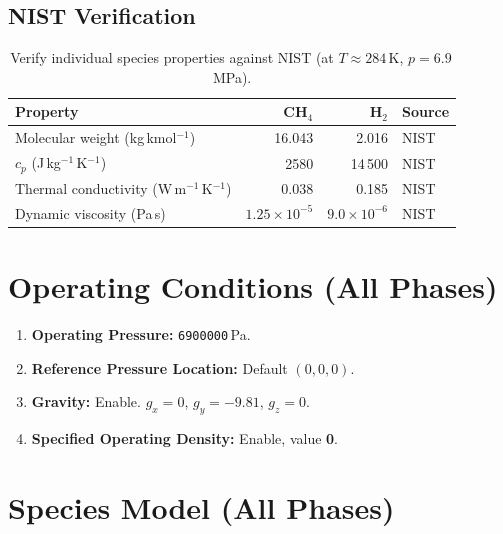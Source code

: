 \documentclass[12pt,a4paper]{report}
\begin{document}
\subsection{NIST Verification}

\begin{table}[H]
\centering
\caption{Verify individual species properties against NIST (at
$T \approx 284$\,K, $p = 6.9$\,MPa).}
\begin{tabular}{@{}lrrl@{}}
\toprule
\textbf{Property} & \textbf{CH$_4$} & \textbf{H$_2$} & \textbf{Source} \\
\midrule
Molecular weight (kg\,kmol$^{-1}$) & 16.043 & 2.016 & NIST \\
$c_p$ (J\,kg$^{-1}$\,K$^{-1}$)    & 2580   & 14\,500 & NIST \\
Thermal conductivity (W\,m$^{-1}$\,K$^{-1}$) & 0.038 & 0.185 & NIST \\
Dynamic viscosity (Pa\,s) & $1.25 \times 10^{-5}$ & $9.0 \times 10^{-6}$ & NIST \\
\bottomrule
\end{tabular}
\end{table}


\section{Operating Conditions (All Phases)}

\begin{enumerate}
  \item \textbf{Operating Pressure:} \texttt{6900000}\,Pa.
  \item \textbf{Reference Pressure Location:} Default $(0, 0, 0)$.
  \item \textbf{Gravity:} Enable.  $g_x = 0$, $g_y = -9.81$,
        $g_z = 0$.
  \item \textbf{Specified Operating Density:} Enable, value
        \textbf{0}.
\end{enumerate}

\noindent{}


\section{Species Model (All Phases)}
\end{document}
